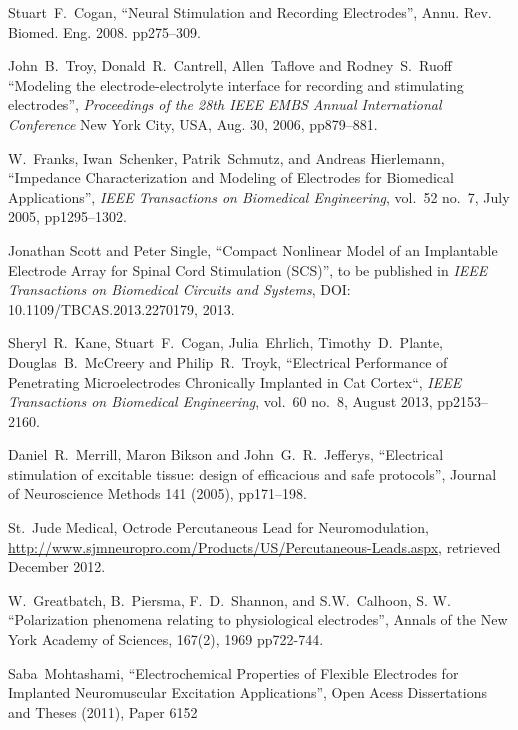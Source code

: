 \documentclass[journal, a4paper]{IEEEtran}
\begin{document}
\begin{thebibliography}{99}


    Stuart~F.~Cogan,
    ``Neural Stimulation and Recording Electrodes'',
    Annu. Rev. Biomed. Eng. 2008. pp275--309.

    John~B.~Troy, Donald~R.~Cantrell, Allen~Taflove and Rodney~S.~Ruoff
    ``Modeling the electrode-electrolyte interface for recording and stimulating electrodes'',
    {\em Proceedings of the 28th IEEE EMBS Annual International Conference}
    New York City, USA, Aug. 30, 2006, pp879--881.

    W.~Franks, Iwan~Schenker, Patrik~Schmutz, and Andreas Hierlemann,
    ``Impedance Characterization and Modeling of Electrodes for Biomedical Applications'',
    \emph{IEEE Transactions on Biomedical Engineering},
    vol.~52 no.~7, July 2005, pp1295--1302.


    Jonathan Scott and Peter Single,
    ``Compact Nonlinear Model of an Implantable Electrode Array for Spinal Cord Stimulation (SCS)'',
    to be published in
    {\em IEEE Transactions on Biomedical Circuits and Systems},
    DOI: 10.1109/TBCAS.2013.2270179, 2013.

    Sheryl~R.~Kane, Stuart~F.~Cogan, Julia~Ehrlich, Timothy~D.~Plante, Douglas~B.~McCreery and Philip~R.~Troyk,
    ``Electrical Performance of Penetrating Microelectrodes Chronically Implanted in Cat Cortex``,
    {\em IEEE Transactions on Biomedical Engineering},
    vol.~60 no.~8, August 2013, pp2153--2160.

    Daniel~R.~Merrill, Maron Bikson and John~G.~R.\ Jefferys,
    ``Electrical stimulation of excitable tissue: design of efficacious and safe protocols'',
    Journal of Neuroscience Methods 141 (2005), pp171--198.

    St.~Jude Medical, Octrode Percutaneous Lead for Neuromodulation,
    \url{http://www.sjmneuropro.com/Products/US/Percutaneous-Leads.aspx},
    retrieved December 2012.

    W.~Greatbatch, B.~Piersma, F.~D.~Shannon, and S.W.~Calhoon, S. W.
    ``Polarization phenomena relating to physiological electrodes'',
    Annals of the New York Academy of Sciences,
    167(2), 1969 pp722-744.


    Saba~Mohtashami,
    ``Electrochemical Properties of Flexible Electrodes for Implanted Neuromuscular Excitation Applications'',
    Open Acess Dissertations and Theses (2011), Paper 6152


\end{thebibliography}
\end{document}

